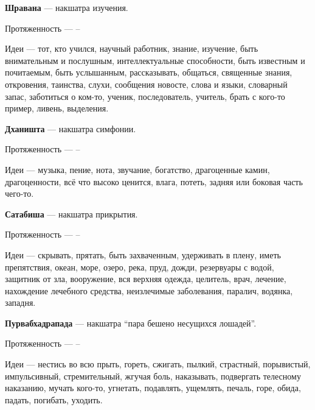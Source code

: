 \begin{myenum}
\begin{mydescr}
		\end{mydescr}
	\item \textbf{Шравана} --- накшатра изучения.
		\begin{mydescr}
			\item[Протяженность] ---  -- 
			\item[Идеи] --- тот, кто учился, научный работник, знание, изучение, быть внимательным и послушным, интеллектуальные способности, быть известным и почитаемым, быть услышанным, рассказывать, общаться, священные знания, откровения, таинства, слухи, сообщения новосте, слова и языки, словарный запас, заботиться о ком-то, ученик, последователь, учитель, брать с кого-то пример, ливень, выделения.
		\end{mydescr}
	\item \textbf{Дханишта} --- накшатра симфонии.
		\begin{mydescr}
			\item[Протяженность] ---  -- \signum{6}{40}{\aquarius}
			\item[Идеи] --- музыка, пение, нота, звучание, богатство, драгоценные камин, драгоценности, всё что высоко ценится, влага, потеть, задняя или боковая часть чего-то.
		\end{mydescr}
	\item \textbf{Сатабиша} --- накшатра прикрытия.
		\begin{mydescr}
			\item[Протяженность] ---  -- \signum{20}{}{\aquarius}
			\item[Идеи] --- скрывать, прятать, быть захваченным, удерживать в плену, иметь препятствия, океан, море, озеро, река, пруд, дожди, резервуары с водой, защитник от зла, вооружение, вся верхняя одежда, целитель, врач, лечение, нахождение лечебного средства, неизлечимые заболевания, паралич, водянка, западня.
		\end{mydescr}
	\item \textbf{Пурвабхадрапада} --- накшатра ``пара бешено несущихся лошадей''.
		\begin{mydescr}
			\item[Протяженность] ---  -- \signum{3}{20}{\pisces}
			\item[Идеи] --- нестись во всю прыть, гореть, сжигать, пылкий, страстный, порывистый, импульсивный, стремительный, жгучая боль, наказывать, подвергать телесному наказанию, мучать кого-то, угнетать, подавлять, ущемлять, печаль, горе, обида, падать, погибать, уходить.

\end{mydescr}
\end{myenum}
